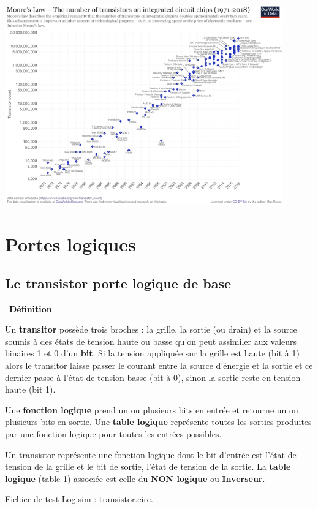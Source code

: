 \documentclass[
  11pt,
]{article}
\newcounter{def}
\newenvironment{definition}[1]
{\par \medskip   \addtocounter{def}{1} \noindent  
\begin{bclogo}[arrondi =0.1,  ombre = true, barre=none, logo=\bcbook, marge=4]{~\textbf{Définition} \textbf{\thedef} {\itshape #1} }  \par}
{
\end{bclogo}
 \par \bigskip }
\newcounter{logi}
\begin{document}
\begin{center}{}

\includegraphics[width=0.9\textwidth,height=\textheight]{images/640px-Moore's_Law_Transistor_Count_1971-2018.png}\\

\end{center}

\hypertarget{portes-logiques}{%
\section{Portes logiques}\label{portes-logiques}}

\hypertarget{le-transistor-porte-logique-de-base}{%
\subsection{Le transistor porte logique de
base}\label{le-transistor-porte-logique-de-base}}

\begin{definition}{}

Un \textbf{transitor} possède trois broches : la grille, la sortie (ou
drain) et la source soumis à des états de tension haute ou basse qu'on
peut assimiler aux valeurs binaires 1 et 0 d'un \textbf{bit}. Si la
tension appliquée sur la grille est haute (bit à 1) alors le transitor
laisse passer le courant entre la source d'énergie et la sortie et ce
dernier passe à l'état de tension basse (bit à 0), sinon la sortie reste
en tension haute (bit 1).

Une \textbf{fonction logique} prend un ou plusieurs bits en entrée et
retourne un ou plusieurs bits en sortie. Une \textbf{table logique}
représente toutes les sorties produites par une fonction logique pour
toutes les entrées possibles.

Un transistor représente une fonction logique dont le bit d'entrée est
l'état de tension de la grille et le bit de sortie, l'état de tension de
la sortie. La \textbf{table logique} (table 1) associée est celle du
\textbf{NON logique} ou \textbf{Inverseur}.

Fichier de test \href{http://www.cburch.com/logisim/}{Logisim} :
\href{circuits_logisim/transistor.circ}{transistor.circ}.

\end{definition}
\end{document}
